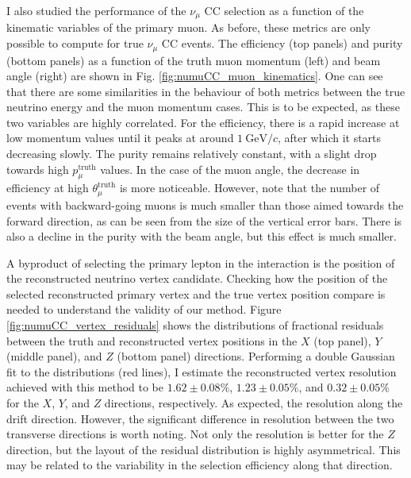 I also studied the performance of the $\nu_{\mu}$ CC selection as a function of the kinematic variables of the primary muon. As before, these metrics are only possible to compute for true $\nu_{\mu}$ CC events. The efficiency (top panels) and purity (bottom panels) as a function of the truth muon momentum (left) and beam angle (right) are shown in Fig. \ref{fig:numuCC_muon_kinematics}. One can see that there are some similarities in the behaviour of both metrics between the true neutrino energy and the muon momentum cases. This is to be expected, as these two variables are highly correlated. For the efficiency, there is a rapid increase at low momentum values until it peaks at around $1~\mathrm{GeV}/c$, after which it starts decreasing slowly. The purity remains relatively constant, with a slight drop towards high $p_{\mu}^{\mathrm{truth}}$ values. In the case of the muon angle, the decrease in efficiency at high $\theta_{\mu}^{\mathrm{truth}}$ is more noticeable. However, note that the number of events with backward-going muons is much smaller than those aimed towards the forward direction, as can be seen from the size of the vertical error bars. There is also a decline in the purity with the beam angle, but this effect is much smaller.

A byproduct of selecting the primary lepton in the interaction is the position of the reconstructed neutrino vertex candidate. Checking how the position of the selected reconstructed primary vertex and the true vertex position compare is needed to understand the validity of our method. Figure \ref{fig:numuCC_vertex_residuals} shows the distributions of fractional residuals between the truth and reconstructed vertex positions in the $X$ (top panel), $Y$ (middle panel), and $Z$ (bottom panel) directions. Performing a double Gaussian fit to the distributions (red lines), I estimate the reconstructed vertex resolution achieved with this method to be $1.62 \pm 0.08 \%$, $1.23 \pm 0.05 \%$, and $0.32 \pm 0.05 \%$ for the $X$, $Y$, and $Z$ directions, respectively. As expected, the resolution along the drift direction. However, the significant difference in resolution between the two transverse directions is worth noting. Not only the resolution is better for the $Z$ direction, but the layout of the residual distribution is highly asymmetrical. This may be related to the variability in the selection efficiency along that direction.

